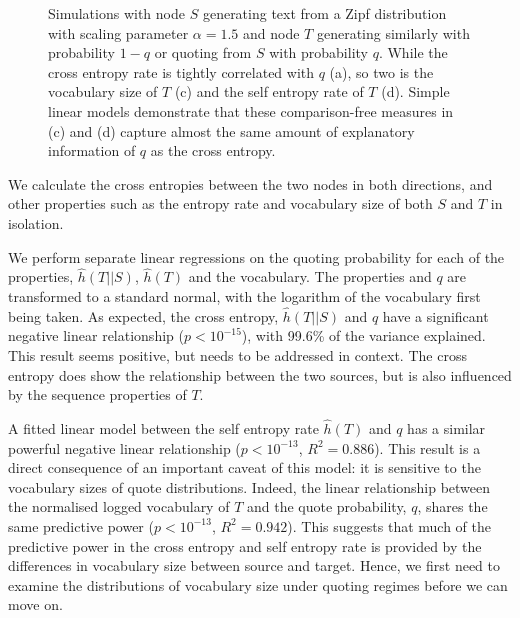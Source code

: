 \begin{figure}[!htbp]
\centering

\caption{Simulations with node $S$ generating text from a Zipf distribution with scaling parameter $\alpha=1.5$ and node $T$ generating similarly with probability $1-q$ or quoting from $S$ with probability $q$. While the cross entropy rate is tightly correlated with $q$ (a), so two is the vocabulary size of $T$ (c) and the self entropy rate of $T$ (d). Simple linear models demonstrate that these comparison-free measures in (c) and (d) capture almost the same amount of explanatory information of $q$ as the cross entropy.}\label{fig:fixedalphasingleflow}
\end{figure}

We calculate the cross entropies between the two nodes in both directions, and other properties such as the entropy rate and vocabulary size of both $S$ and $T$ in isolation.

We perform separate linear regressions on the quoting probability for each of the properties, $\hat{h}(T||S)$, $\hat{h}(T)$ and the vocabulary. The properties and $q$ are transformed to a standard normal, with the logarithm of the vocabulary first being taken.
As expected, the cross entropy, $\hat{h}(T||S)$ and $q$ have a significant negative linear relationship ($p<10^{-15}$), with 99.6\% of the variance explained. This result seems positive, but needs to be addressed in context. The cross entropy does show the relationship between the two sources, but is also influenced by the sequence properties of $T$.

A fitted linear model between the self entropy rate $\hat{h}(T)$ and $q$ has a similar powerful negative linear relationship ($p<10^{-13}$, $R^2 = 0.886$). This result is a direct consequence of an important caveat of this model: it is sensitive to the vocabulary sizes of quote distributions. Indeed, the linear relationship between the normalised logged vocabulary of $T$ and the quote probability, $q$, shares the same predictive power ($p<10^{-13}$, $R^2 = 0.942$). This suggests that much of the predictive power in the cross entropy and self entropy rate is provided by the differences in vocabulary size between source and target. Hence, we first need to examine the distributions of vocabulary size under quoting regimes before we can move on.

